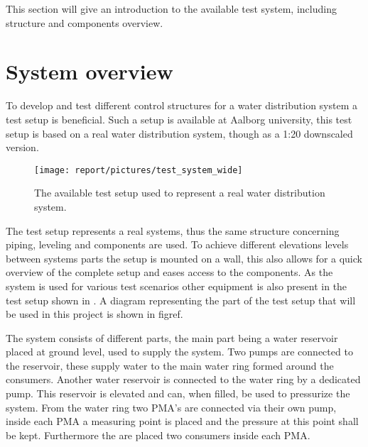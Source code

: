 This section will give an introduction to the available test system, including structure and components overview.  

\section{System overview}
\label{system_overview}
To develop and test different control structures for a water distribution system a test setup is beneficial.
Such a setup is available at Aalborg university, this test setup is based on a real water distribution system, though as a 1:20 downscaled version.

\begin{figure}[H]
\centering
\texttt{[image: report/pictures/test\_system\_wide]}
\caption{The available test setup used to represent a real water distribution system.}
\label{fig:test_setup}
\end{figure}


The test setup represents a real systems, thus the same structure concerning piping, leveling and components are used. To achieve different elevations levels between systems parts the setup is mounted on a wall, this also allows for a quick overview of the complete setup and eases access to the components. As the system is used for various test scenarios other equipment is also present in the test setup shown in . A diagram representing the part of the test setup that will be used in this project is shown in figref. 



The system consists of different parts, the main part being a water reservoir placed at ground level, used to supply the system. Two pumps are connected to the reservoir, these supply water to the main water ring formed around the consumers. 
Another water reservoir is connected to the water ring by a dedicated pump. This reservoir is elevated and can, when filled, be used to pressurize the system. 
From the water ring two PMA's are connected via their own pump, inside each PMA a measuring point is placed and the pressure at this point shall be kept. Furthermore the are placed two consumers inside each PMA.         

